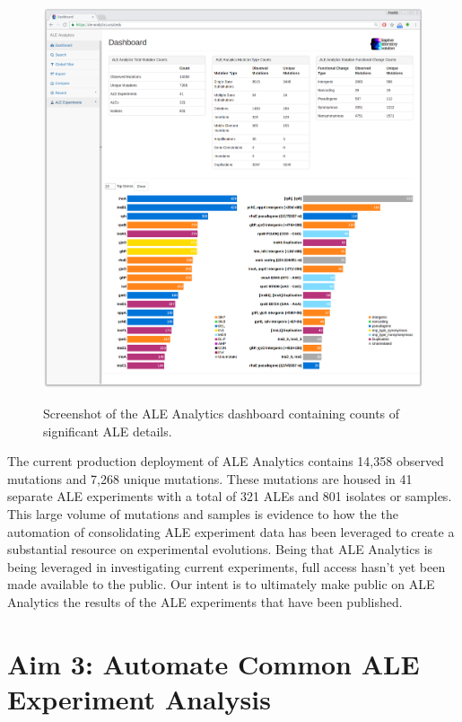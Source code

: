 \documentclass[12pt,final,masters,chapterheads]{ucsd}  %
\begin{document}
\begin{figure}[H]
  \caption{Screenshot of the ALE Analytics dashboard containing counts of significant ALE details.}
  \centering
  \includegraphics[width=1\textwidth]{dashboard_screenshot.png}
  \label{fig:dashboard_screenshot}
\end{figure}

The current production deployment of ALE Analytics contains 14,358 observed mutations and 7,268 unique mutations. These mutations are housed in 41 separate ALE experiments with a total of 321 ALEs and 801 isolates or samples. This large volume of mutations and samples is evidence to how the the automation of consolidating ALE experiment data has been leveraged to create a substantial resource on experimental evolutions. Being that ALE Analytics is being leveraged in investigating current experiments, full access hasn't yet been made available to the public. Our intent is to ultimately make public on ALE Analytics the results of the ALE experiments that have been published.

% 
% 
\chapter{Aim 3: Automate Common ALE Experiment Analysis}
\end{document}
